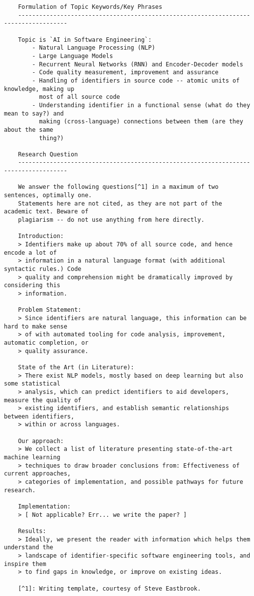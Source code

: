 \documentclass[conference]{IEEEtran}
\begin{document}
\begin{verbatim}
    Formulation of Topic Keywords/Key Phrases
    ------------------------------------------------------------------------------------

    Topic is `AI in Software Engineering`:
        - Natural Language Processing (NLP)
        - Large Language Models
        - Recurrent Neural Networks (RNN) and Encoder-Decoder models
        - Code quality measurement, improvement and assurance
        - Handling of identifiers in source code -- atomic units of knowledge, making up
          most of all source code
        - Understanding identifier in a functional sense (what do they mean to say?) and
          making (cross-language) connections between them (are they about the same
          thing?)

    Research Question
    ------------------------------------------------------------------------------------

    We answer the following questions[^1] in a maximum of two sentences, optimally one.
    Statements here are not cited, as they are not part of the academic text. Beware of
    plagiarism -- do not use anything from here directly.

    Introduction:
    > Identifiers make up about 70% of all source code, and hence encode a lot of
    > information in a natural language format (with additional syntactic rules.) Code
    > quality and comprehension might be dramatically improved by considering this
    > information.

    Problem Statement:
    > Since identifiers are natural language, this information can be hard to make sense
    > of with automated tooling for code analysis, improvement, automatic completion, or
    > quality assurance.

    State of the Art (in Literature):
    > There exist NLP models, mostly based on deep learning but also some statistical
    > analysis, which can predict identifiers to aid developers, measure the quality of
    > existing identifiers, and establish semantic relationships between identifiers,
    > within or across languages.

    Our approach:
    > We collect a list of literature presenting state-of-the-art machine learning
    > techniques to draw broader conclusions from: Effectiveness of current approaches,
    > categories of implementation, and possible pathways for future research.

    Implementation:
    > [ Not applicable? Err... we write the paper? ]

    Results:
    > Ideally, we present the reader with information which helps them understand the
    > landscape of identifier-specific software engineering tools, and inspire them
    > to find gaps in knowledge, or improve on existing ideas.

    [^1]: Writing template, courtesy of Steve Eastbrook.
\end{verbatim}
\end{document}
